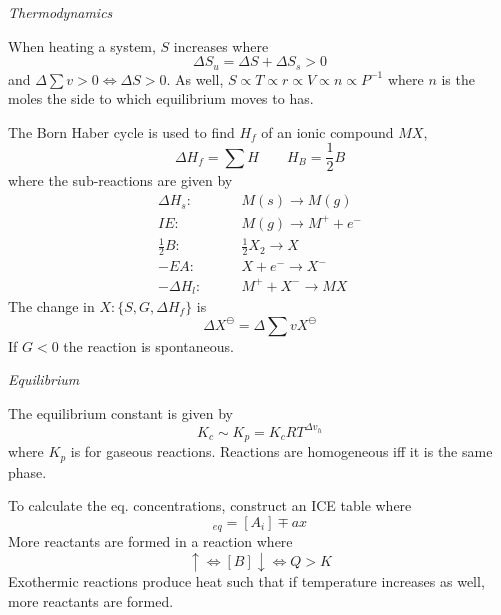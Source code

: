 \documentclass[10pt]{extarticle}
\begin{document}
\begin{multicols*}{2}


{\large\textit{Thermodynamics}}
\bigskip

When heating a system, $S$ increases where \begin{equation}
  \Delta S_u = \Delta S + \Delta S_s > 0
\end{equation}
and $\Delta \sum v > 0 \iff \Delta S > 0$. As well, $S \propto T \propto r \propto V \propto n \propto P^{-1}$ where $n$ is the moles the side to which equilibrium moves to has.

\bigskip
The Born Haber cycle is used to find $H_f$ of an ionic compound $MX$,
\begin{equation}
  \Delta H_f = \textstyle\sum H \qquad H_B = \textstyle\frac{1}{2} B
\end{equation}
where the sub-reactions are given by
\begin{align}
  \Delta H_s: \qquad & M(s) \to M(g) \nonumber\\
  IE: \qquad & M(g) \to M^+ + e^- \nonumber\\
  \textstyle\frac{1}{2} B: \qquad & \textstyle\frac{1}{2} X_2 \to X \\
  -EA: \qquad & X + e^- \to X^- \nonumber\\
  - \Delta H_l: \qquad & M^+ + X^- \to MX \nonumber
\end{align}
The change in $X : \{ S, G, \Delta H_f \}$ is
\begin{equation}
  \Delta X^\ominus = \Delta \textstyle\sum v X^\ominus
\end{equation}
If $G < 0$ the reaction is spontaneous.


\vspace{7mm}
{\large\textit{Equilibrium}}
\bigskip

The equilibrium constant is given by \begin{equation}
  K_c \sim K_p = K_c RT^{\Delta v_h}
\end{equation}
where $K_p$ is for gaseous reactions. Reactions are homogeneous iff it is the same phase.

\bigskip
To calculate the eq. concentrations, construct an ICE table where \begin{equation}
  [A_i]_{eq} = [A_i] \mp ax
\end{equation}
More reactants are formed in a reaction where
\begin{equation}
  [A] \uparrow \iff [B] \downarrow \iff Q > K
\end{equation}
Exothermic reactions produce heat such that if temperature increases as well, more reactants are formed.


\end{multicols*}
\end{document}
